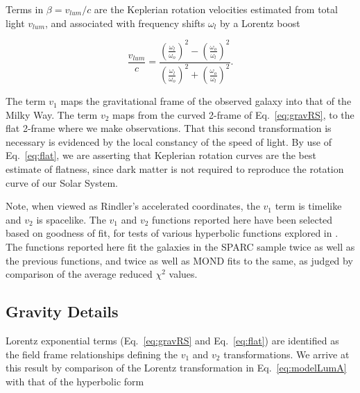 \documentclass[reprint,%
 amsmath,amssymb,
 aps,
]{revtex4-1}
\begin{document}
Terms in 
$\beta = v_{lum}/c$ are the
Keplerian rotation velocities  estimated from total light  $v_{lum}$, and  associated with  frequency shifts $\omega_{l}$      by a Lorentz boost   

 \begin{equation}
 \frac{v_{lum} }{c}=
\frac{  \left( \frac{\omega_{l}}{\omega_o}\right)^2 -  \left( \frac{\omega_o}{\omega_{l}} \right)^2 }{  \left( \frac{\omega_{l}}{\omega_o}\right)^2  +  \left( \frac{\omega_o}{\omega_{l}}\right)^2 }. 
\label{eq:lumlorentz}
\end{equation} 
 
 
  
 
 
The   term $v_1$ maps the gravitational frame of the observed galaxy into that of the Milky Way. The   term $v_2$    maps from  the   curved 2-frame  of  Eq.~\ref{eq:gravRS},  to  the flat 2-frame where we make observations. 
  That this second transformation  is necessary is evidenced by the local constancy of the speed of light. 
By use of Eq.~\ref{eq:flat}, we are  asserting  that Keplerian rotation curves are     the best estimate of flatness, since dark matter is not required to  reproduce the rotation curve of our Solar System.
 
    
  
 
 Note, when viewed as    Rindler's accelerated coordinates\cite{MTW,Wald, rindler2013essential}, the   $v_1$ term is  timelike   and $v_2$ is spacelike. The  $v_1$ and $v_2$ functions reported here have been   selected based on goodness of fit, for tests of various hyperbolic functions  explored in   \cite{Cisneros:2013vha,Cisneros:2014fea,Cisneros2015,Cisn2016}. 
 The    functions 
 reported here fit the galaxies in the SPARC sample twice as well as the previous functions,  and twice as well as MOND fits to the same, as judged  by comparison of the  average reduced $\chi^{2}$ values. 
 
  
 
\subsection{Gravity Details \label{sec:gravDets}}

  
    
    
Lorentz exponential terms (Eq.~\ref{eq:gravRS} and Eq.~\ref{eq:flat})
  are    identified  as the field frame relationships defining the $v_1$ and $v_2$ transformations. We arrive at this result  by  comparison of 
     the  Lorentz transformation in  Eq.~\ref{eq:modelLumA} with 
 that of the    hyperbolic form \cite{rindler2013essential} 
\end{document}
